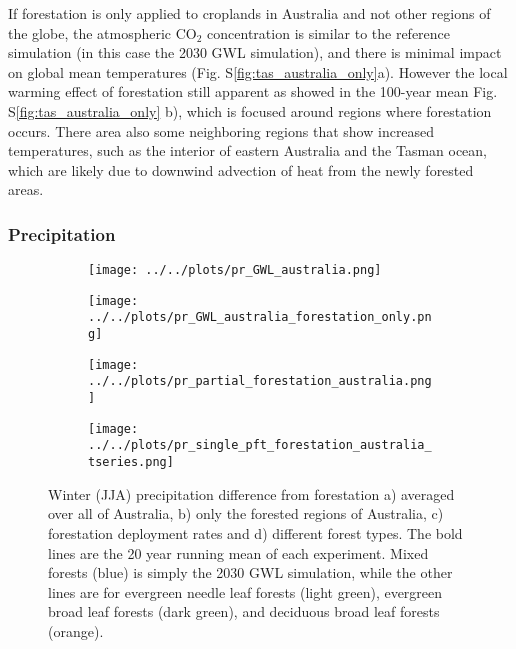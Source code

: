 \documentclass[]{article}
\begin{document}
If forestation is only applied to croplands in Australia and not other regions of the globe, the atmospheric CO$_2$ concentration is similar to the reference simulation (in this case the 2030 GWL simulation), and there is minimal impact on global mean temperatures (Fig. S\ref{fig:tas_australia_only}a).
However the local warming effect of forestation still apparent as showed in the 100-year mean Fig. S\ref{fig:tas_australia_only} b), which is focused around regions where forestation occurs.
There area also some neighboring regions that show increased temperatures, such as the interior of eastern Australia and the Tasman ocean, which are likely due to downwind advection of heat from the newly forested areas.

\subsubsection{Precipitation}

\begin{figure}[H]
    \centering
    \begin{subfigure}[b]{0.4\linewidth}
        \texttt{[image: ../../plots/pr\_GWL\_australia.png]}
    \end{subfigure}
    \begin{subfigure}[b]{0.4\linewidth}
        \texttt{[image: ../../plots/pr\_GWL\_australia\_forestation\_only.png]}
    \end{subfigure}
    \begin{subfigure}[b]{0.4\linewidth}
        \texttt{[image: ../../plots/pr\_partial\_forestation\_australia.png]}
    \end{subfigure}
    \begin{subfigure}[b]{0.4\linewidth}
        \texttt{[image: ../../plots/pr\_single\_pft\_forestation\_australia\_tseries.png]}
    \end{subfigure}
    \caption{Winter (JJA) precipitation difference from forestation a) averaged over all of Australia, b) only the forested regions of Australia, c) forestation deployment rates and d) different forest types. The bold lines are the 20 year running mean of each experiment. Mixed forests (blue) is simply the 2030 GWL simulation, while the other lines are for evergreen needle leaf forests (light green), evergreen broad leaf forests (dark green), and deciduous broad leaf forests (orange).}
    \label{fig:pr_australia_timeseries}
\end{figure}
\end{document}
